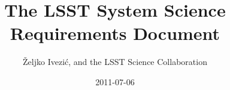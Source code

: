 \documentclass[SE,toc]{lsstdoc}
\title{The LSST System Science Requirements Document}
\author{\v{Z}eljko {Ivezi{\'c}}, and the LSST Science Collaboration}
\date{2011-07-06}
\begin{document}
\maketitle











\newpage
\printglossary
\end{document}
